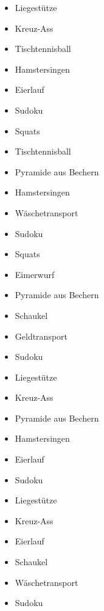 \begin{itemize}[label=$\bigcirc$]
    \item Liegestütze
    \item Kreuz-Ass
    \item Tischtennisball
    \item Hamstersingen
    \item Eierlauf
    \item Sudoku
\end{itemize}
\newpage

\begin{itemize}[label=$\bigcirc$]
    \item Squats
    \item Tischtennisball
    \item Pyramide aus Bechern
    \item Hamstersingen
    \item Wäschetransport
    \item Sudoku
\end{itemize}
\newpage

\begin{itemize}[label=$\bigcirc$]
    \item Squats
    \item Eimerwurf
    \item Pyramide aus Bechern
    \item Schaukel
    \item Geldtransport 
    \item Sudoku
\end{itemize}
\newpage

\begin{itemize}[label=$\bigcirc$]
    \item Liegestütze
    \item Kreuz-Ass
    \item Pyramide aus Bechern
    \item Hamstersingen
    \item Eierlauf
    \item Sudoku
\end{itemize}
\newpage

\begin{itemize}[label=$\bigcirc$]
    \item Liegestütze
    \item Kreuz-Ass
    \item Eierlauf
    \item Schaukel
    \item Wäschetransport
    \item Sudoku
\end{itemize}
\newpage

